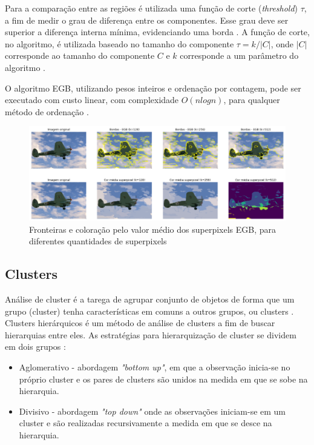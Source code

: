 \begin{document}
Para a comparação entre as regiões é utilizada uma função de corte (\textit{threshold}) $\tau$, a fim de medir o grau de diferença entre os componentes. Esse grau deve ser superior a diferença interna mínima, evidenciando uma borda \cite{FELZENSZWALB}. A função de corte, no algoritmo, é utilizada baseado no tamanho do componente $\tau=k/|C|$, onde $|C|$ corresponde ao tamanho do componente $C$ e $k$ corresponde a um parâmetro do algoritmo \cite{FELZENSZWALB}.

O algoritmo EGB, utilizando pesos inteiros e ordenação por contagem, pode ser executado com custo linear, com complexidade $O(nlogn)$, para qualquer método de ordenação \cite{FELZENSZWALB}. 

\begin{figure}[ht]
\centering
\includegraphics[width=1.\textwidth]{felz_segmentation_compare.png}
\caption{Fronteiras e coloração pelo valor médio dos superpixels EGB, para diferentes quantidades de superpixels}
\label{fig:EGB}
\end{figure}


\subsection{Clusters} \label{ssec:clusters}

Análise de cluster é a tarega de agrupar conjunto de objetos de forma que um grupo (cluster) tenha características em comuns a outros grupos, ou clusters \cite{WIKI_CLUSTER_ANALYSIS}. Clusters hierárquicos é um método de análise de clusters a fim de buscar hierarquias entre eles. As estratégias para hierarquização de cluster se dividem em dois grupos \cite{ROKACH}:

\begin{itemize}
 \item Aglomerativo - abordagem \textit{"bottom up"}, em que a observação inicia-se no próprio cluster e os pares de clusters são unidos na medida em que se sobe na hierarquia. 
 \item Divisivo - abordagem \textit{"top down"} onde as observações iniciam-se em um cluster e são realizadas recursivamente a medida em que se desce na hierarquia.
\end{itemize}
\end{document}
